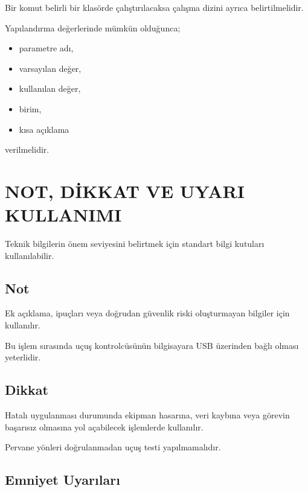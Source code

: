 \documentclass[11pt,a4paper]{article}
\begin{document}
Bir komut belirli bir klasörde çalıştırılacaksa
çalışma dizini ayrıca belirtilmelidir.

Yapılandırma değerlerinde mümkün olduğunca;

\begin{itemize}
    \item parametre adı,
    \item varsayılan değer,
    \item kullanılan değer,
    \item birim,
    \item kısa açıklama
\end{itemize}

verilmelidir.


\newpage

\section{NOT, DİKKAT VE UYARI KULLANIMI}

Teknik bilgilerin önem seviyesini belirtmek için standart bilgi kutuları
kullanılabilir.

\subsection{Not}

Ek açıklama,
ipuçları
veya doğrudan güvenlik riski oluşturmayan bilgiler için kullanılır.

\begin{notkutusu}
Bu işlem sırasında uçuş kontrolcüsünün bilgisayara USB üzerinden bağlı
olması yeterlidir.
\end{notkutusu}

\subsection{Dikkat}

Hatalı uygulanması durumunda ekipman hasarına,
veri kaybına
veya görevin başarısız olmasına yol açabilecek işlemlerde kullanılır.

\begin{dikkatkutusu}
Pervane yönleri doğrulanmadan uçuş testi yapılmamalıdır.
\end{dikkatkutusu}

\subsection{Emniyet Uyarıları}
\end{document}
